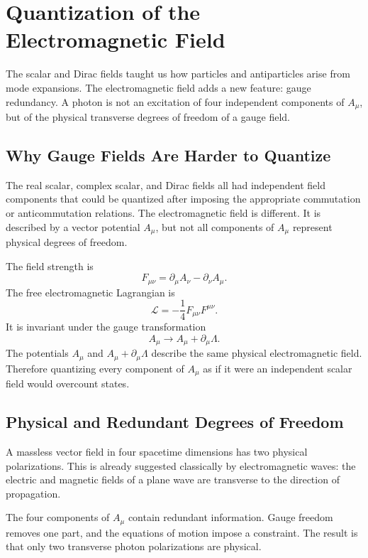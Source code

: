 \chapter{Quantization of the Electromagnetic Field}

\begin{remarkbox}
The scalar and Dirac fields taught us how particles and antiparticles arise from
mode expansions. The electromagnetic field adds a new feature: gauge redundancy.
A photon is not an excitation of four independent components of \(A_\mu\), but
of the physical transverse degrees of freedom of a gauge field.
\end{remarkbox}

\section{Why Gauge Fields Are Harder to Quantize}

The real scalar, complex scalar, and Dirac fields all had independent field
components that could be quantized after imposing the appropriate commutation or
anticommutation relations. The electromagnetic field is different. It is
described by a vector potential \(A_\mu\), but not all components of
\(A_\mu\) represent physical degrees of freedom.

The field strength is
\[
    F_{\mu\nu}=\partial_\mu A_\nu-\partial_\nu A_\mu.
\]
The free electromagnetic Lagrangian is
\[
    \mathcal{L}
    = -\frac{1}{4}F_{\mu\nu}F^{\mu\nu}.
\]
It is invariant under the gauge transformation
\[
    A_\mu\longrightarrow A_\mu+\partial_\mu\Lambda.
\]
The potentials \(A_\mu\) and \(A_\mu+\partial_\mu\Lambda\) describe the same
physical electromagnetic field. Therefore quantizing every component of
\(A_\mu\) as if it were an independent scalar field would overcount states.

\section{Physical and Redundant Degrees of Freedom}

A massless vector field in four spacetime dimensions has two physical
polarizations. This is already suggested classically by electromagnetic waves:
the electric and magnetic fields of a plane wave are transverse to the direction
of propagation.

The four components of \(A_\mu\) contain redundant information. Gauge freedom
removes one part, and the equations of motion impose a constraint. The result is
that only two transverse photon polarizations are physical.

